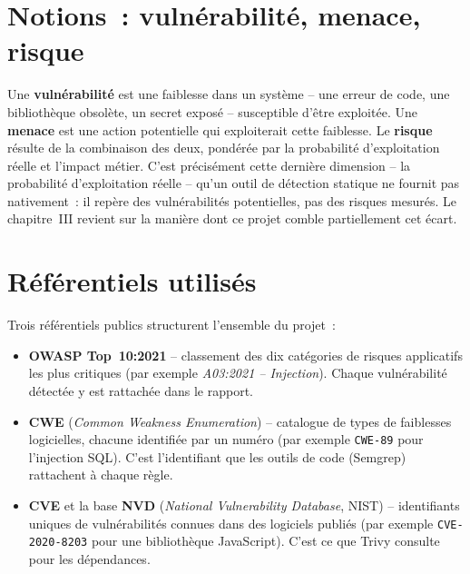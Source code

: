 \documentclass[12pt,a4paper,oneside]{report}
\begin{document}
\section{Notions~: vuln\'erabilit\'e, menace, risque}
Une \textbf{vuln\'erabilit\'e} est une faiblesse dans un syst\`eme -- une erreur de code, une biblioth\`eque obsol\`ete, un secret expos\'e -- susceptible d'\^etre exploit\'ee. Une \textbf{menace} est une action potentielle qui exploiterait cette faiblesse. Le \textbf{risque} r\'esulte de la combinaison des deux, pond\'er\'ee par la probabilit\'e d'exploitation r\'eelle et l'impact m\'etier. C'est pr\'ecis\'ement cette derni\`ere dimension -- la probabilit\'e d'exploitation r\'eelle -- qu'un outil de d\'etection statique ne fournit pas nativement~: il rep\`ere des vuln\'erabilit\'es potentielles, pas des risques mesur\'es. Le chapitre~III revient sur la mani\`ere dont ce projet comble partiellement cet \'ecart.

\section{R\'ef\'erentiels utilis\'es}
Trois r\'ef\'erentiels publics structurent l'ensemble du projet~:
\begin{itemize}
\item \textbf{OWASP Top~10:2021} -- classement des dix cat\'egories de risques applicatifs les plus critiques (par exemple \emph{A03:2021 -- Injection}). Chaque vuln\'erabilit\'e d\'etect\'ee y est rattach\'ee dans le rapport.
\item \textbf{CWE} (\emph{Common Weakness Enumeration}) -- catalogue de types de faiblesses logicielles, chacune identifi\'ee par un num\'ero (par exemple \texttt{CWE-89} pour l'injection SQL). C'est l'identifiant que les outils de code (Semgrep) rattachent \`a chaque r\`egle.
\item \textbf{CVE} et la base \textbf{NVD} (\emph{National Vulnerability Database}, NIST) -- identifiants uniques de vuln\'erabilit\'es connues dans des logiciels publi\'es (par exemple \texttt{CVE-2020-8203} pour une biblioth\`eque JavaScript). C'est ce que Trivy consulte pour les d\'ependances.
\end{itemize}
\end{document}
